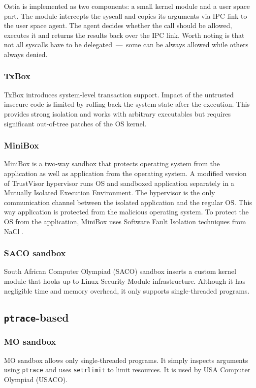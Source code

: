 \documentclass[en]{pracamgr}
\begin{document}
Ostia is implemented as two components: a small kernel module and a user space part. The module intercepts the syscall and copies its arguments via IPC link to the user space agent. The agent decides whether the call should be allowed, executes it and returns the results back over the IPC link. Worth noting is that not all syscalls have to be delegated~---~some can be always allowed while others always denied.

\subsubsection{TxBox}
TxBox \cite{jana2011txbox} introduces system-level transaction support. Impact of the untrusted insecure code is limited by rolling back the system state after the execution. This provides strong isolation and works with arbitrary executables but requires significant out-of-tree patches of the OS kernel.

\subsubsection{MiniBox}
MiniBox \cite{li2014minibox} is a two-way sandbox that protects operating system from the application as well as application from the operating system. A modified version of TrustVisor \cite{mccune2010trustvisor} hypervisor runs OS and sandboxed application separately in a Mutually Isolated Execution Environment. The hypervisor is the only communication channel between the isolated application and the regular OS. This way application is protected from the malicious operating system. To protect the OS from the application, MiniBox uses Software Fault Isolation techniques from NaCl \cite{yee2010native}.

\subsubsection{SACO sandbox}

South African Computer Olympiad (SACO) sandbox \cite{merry2009using} inserts a custom kernel module that hooks up to Linux Security Module infrastructure. Although it has negligible time and memory overhead, it only supports single-threaded programs.

\subsection{\texttt{ptrace}-based}

\subsubsection{MO sandbox}
MO sandbox \cite{marevs2007perspectives, kolstad2009infrastructure} allows only single-threaded programs. It simply inspects arguments using \texttt{ptrace} and uses \texttt{setrlimit} \cite{man_getrlimit_setrlimit_prlimit} to limit resources. It is used by USA Computer Olympiad (USACO).
\end{document}
